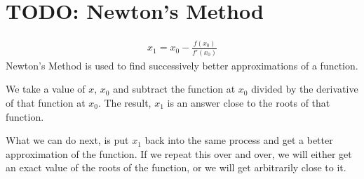 \chapter{TODO: Newton's Method}
\label{chap:NewtonsMethod}
\begin{align}
  x_1 = x_0 - \frac{f(x_0)}{f'(x_0)}
\end{align}
Newton's Method is used to find successively better approximations of a function.

\noindent We take a value of $x$, $x_0$ and subtract the function at $x_0$
divided by the derivative of that function at $x_0$. The result, $x_1$ is an
answer close to the roots of that function.

\noindent What we can do next, is put $x_1$ back into the same process and get a
better approximation of the function. If we repeat this over and over, we will
either get an exact value of the roots of the function, or we will get
arbitrarily close to it.